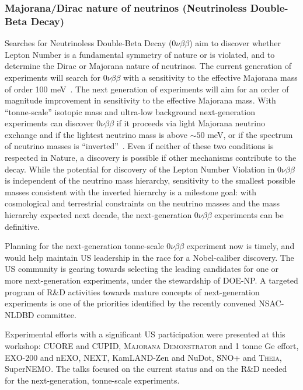 \subsubsection{Majorana/Dirac nature of neutrinos (Neutrinoless
  Double-Beta Decay)}

Searches for Neutrinoless Double-Beta Decay ($0\nu\beta\beta$) aim to
discover whether Lepton Number is a fundamental symmetry of nature or
is violated, and to determine the Dirac or Majorana nature of
neutrinos. The current generation of experiments will search for
$0\nu\beta\beta$ with a sensitivity to the effective Majorana mass of
order 100 meV~\cite{deGouvea:2013onf}. The next generation of
experiments will aim for an order of magnitude improvement in
sensitivity to the effective Majorana mass. With ``tonne-scale''
isotopic mass and ultra-low background next-generation experiments can
discover $0\nu\beta\beta$ if it proceeds via light Majorana neutrino
exchange and if the lightest neutrino mass is above $\sim50$ meV, or
if the spectrum of neutrino masses is
``inverted''~\cite{Bahcall:2004ip}.  Even if neither of these two
conditions is respected in Nature, a discovery is possible if other
mechanisms contribute to the decay. While the potential for discovery
of the Lepton Number Violation in $0\nu\beta\beta$ is independent of
the neutrino mass hierarchy, sensitivity to the smallest possible
masses consistent with the inverted hierarchy is a milestone goal:
with cosmological and terrestrial constraints on the neutrino masses
and the mass hierarchy expected next decade, the next-generation
$0\nu\beta\beta$ experiments can be definitive.

Planning for the next-generation tonne-scale $0\nu\beta\beta$
experiment now is timely, and would help maintain US leadership in the
race for a Nobel-caliber discovery. The US community is gearing
towards selecting the leading candidates for one or more
next-generation experiments, under the stewardship of DOE-NP.  A
targeted program of R\&D activities towards mature concepts of
next-generation experiments is one of the priorities identified by the
recently convened NSAC-NLDBD committee.

Experimental efforts with a significant US participation were
presented at this workshop: CUORE and CUPID, \textsc{Majorana
  Demonstrator\/} and 1 tonne Ge effort, EXO-200 and nEXO, NEXT,
KamLAND-Zen and NuDot, SNO+ and \textsc{Theia}, SuperNEMO. The talks
focused on the current status and on the R\&D needed for the
next-generation, tonne-scale experiments.


